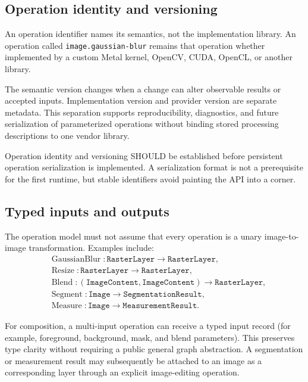\documentclass[11pt,a4paper,oneside]{article}
\begin{document}
\subsection{Operation identity and versioning}

An operation identifier names its semantics, not the implementation library. An operation called \texttt{image.gaussian-blur} remains that operation whether implemented by a custom Metal kernel, OpenCV, CUDA, OpenCL, or another library.

The semantic version changes when a change can alter observable results or accepted inputs. Implementation version and provider version are separate metadata. This separation supports reproducibility, diagnostics, and future serialization of parameterized operations without binding stored processing descriptions to one vendor library.

Operation identity and versioning SHOULD be established before persistent operation serialization is implemented. A serialization format is not a prerequisite for the first runtime, but stable identifiers avoid painting the API into a corner.

\subsection{Typed inputs and outputs}

The operation model must not assume that every operation is a unary image-to-image transformation. Examples include:
\begin{align*}
  &\operatorname{GaussianBlur}: \texttt{RasterLayer} \rightarrow \texttt{RasterLayer},\\
  &\operatorname{Resize}: \texttt{RasterLayer} \rightarrow \texttt{RasterLayer},\\
  &\operatorname{Blend}: (\texttt{ImageContent},\texttt{ImageContent}) \rightarrow \texttt{RasterLayer},\\
  &\operatorname{Segment}: \texttt{Image} \rightarrow \texttt{SegmentationResult},\\
  &\operatorname{Measure}: \texttt{Image} \rightarrow \texttt{MeasurementResult}.
\end{align*}

For composition, a multi-input operation can receive a typed input record (for example, foreground, background, mask, and blend parameters). This preserves type clarity without requiring a public general graph abstraction. A segmentation or measurement result may subsequently be attached to an image as a corresponding layer through an explicit image-editing operation.
\end{document}
